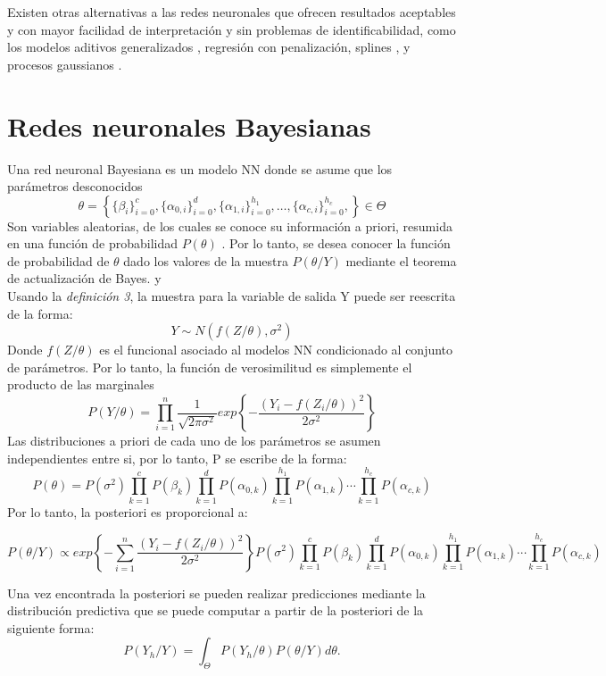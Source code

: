 \documentclass[nojss]{jss}
\begin{document}
Existen otras alternativas a las redes neuronales que ofrecen resultados aceptables y con mayor facilidad de interpretación y sin problemas de identificabilidad, como los modelos aditivos generalizados \cite{Rigby2005}, regresión con penalización, splines \cite{Silverman1985}, y procesos gaussianos \cite{gramacy2020surrogates}.  
 
\section{Redes neuronales Bayesianas} 
 
 Una red neuronal Bayesiana es un modelo NN donde se asume que los parámetros desconocidos $$\theta = \left\{ \{\beta_i\}_{i=0}^{c},\{\alpha_{0,i}\}_{i=0}^{d},\{\alpha_{1,i}\}_{i=0}^{h_1},\ldots, \{\alpha_{c,i}\}_{i=0}^{h_c}, \right\} \in \Theta$$ 
Son variables aleatorias, de los cuales se conoce su información a priori, resumida en una función de probabilidad $P(\theta)$ \cite{Bhat2006}. Por lo tanto, se desea conocer la función de probabilidad de $\theta$ dado los valores de la muestra $P(\theta/Y)$ mediante el teorema de actualización de Bayes. \cite{Miggon} y \cite{degroot19886}\\

Usando la \textit{definición 3}, la muestra para la variable de salida Y puede ser reescrita de la forma:
$$Y \sim N(f(Z/\theta),\sigma^2)$$
Donde $f(Z/ \theta)$ es el funcional asociado al modelos NN condicionado al conjunto de parámetros. Por lo tanto, la función de verosimilitud es simplemente el producto de las marginales
$$P(Y/\theta) = \prod_{i=1}^n\dfrac{1}{\sqrt{2\pi\sigma^2}}exp \left\{ - \dfrac{(Y_i- f(Z_i/\theta) )^2}{2\sigma^2} \right\}$$
Las distribuciones a priori de cada uno de los parámetros se asumen independientes entre si, por lo tanto, P se escribe de la forma:
 $$P(\theta) = P(\sigma^2)\prod_{k=1}^cP(\beta_k)\prod_{k=1}^d P(\alpha_{0,k})\prod_{k=1}^{h_1} P(\alpha_{1,k})\cdots \prod_{k=1}^{h_c} P(\alpha_{c,k})$$
Por lo tanto, la posteriori es proporcional a:

$$P(\theta/Y) \propto  exp \left\{ - \sum_{i=1}^n\dfrac{(Y_i- f(Z_i/\theta) )^2}{2\sigma^2} \right\}P(\sigma^2)\prod_{k=1}^cP(\beta_k)\prod_{k=1}^d P(\alpha_{0,k})\prod_{k=1}^{h_1} P(\alpha_{1,k})\cdots \prod_{k=1}^{h_c} P(\alpha_{c,k})$$ 
 
Una vez encontrada la posteriori se pueden realizar predicciones mediante la distribución  predictiva que se puede computar a partir de la posteriori de la siguiente forma:
$$P(Y_h/Y) = \int_{\Theta}P(Y_h/\theta)P(\theta/Y)d\theta.$$
\end{document}
